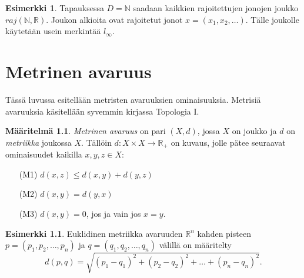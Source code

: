 \documentclass[12pt,a4paper,leqno]{report}
\newcommand{\R}{\mathbb{R}}
\newcommand{\N}{\mathbb{N}}
\theoremstyle{plain}
\theoremstyle{definition}
\newtheorem{maar}[equation]{Määritelmä}
\newtheorem{esim}[equation]{Esimerkki}
\theoremstyle{remark}
\begin{document}
\begin{esim}
Tapauksessa $D=\N$ saadaan kaikkien rajoitettujen jonojen joukko $raj(\N,\R).$ Joukon alkioita ovat rajoitetut jonot $x=(x_1,x_2,\dots).$ Tälle joukolle käytetään usein merkintää $l_\infty$.

\end{esim}


\chapter{Metrinen avaruus}\label{metrinen}
Tässä luvussa esitellään metristen avaruuksien ominaisuuksia. Metrisiä avaruuksia käsitellään syvemmin kirjassa Topologia I.%
\begin{maar} \emph{Metrinen avaruus} 
on pari $(X,d)$, jossa $X$ on joukko ja $d$ on \emph{metriikka} joukossa $X$.
Tällöin $d\colon X\times X\rightarrow \R_+$ on kuvaus, jolle pätee seuraavat ominaisuudet kaikilla $x,y,z\in X$:
\begin{itemize}
\item[(M1)]$d(x,z)\leq d(x,y)+d(y,z)$
\item[(M2)]$d(x,y)=d(y,x)$
\item[(M3)]$d(x,y)=0$, jos ja vain jos $x=y$.
\end{itemize} 
\end{maar} 

\begin{esim}
Euklidinen metriikka avaruuden $\R^n$ kahden pisteen $p=(p_1,p_2,\dots,p_n)$ ja $q=(q_1,q_2,\dots,q_n)$ välillä on määritelty 
$$d(p,q)=\sqrt{(p_1-q_1)^2+(p_2-q_2)^2+\dots+(p_n-q_n)^2}.$$
\end{esim}
\end{document}
